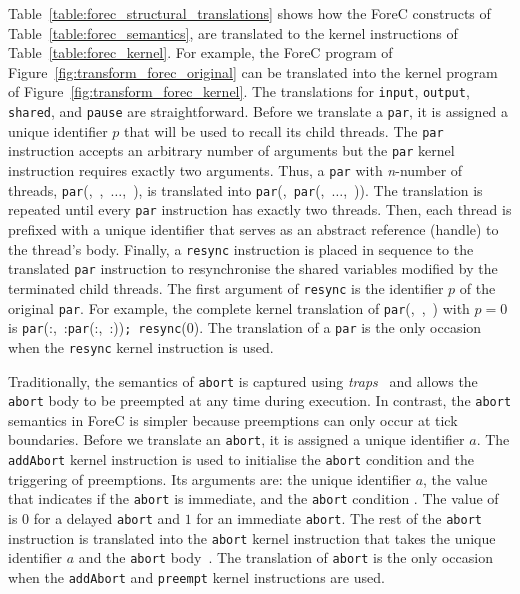 Table~\ref{table:forec_structural_translations} shows how 
the ForeC constructs of Table~\ref{table:forec_semantics}, 
are translated to the kernel instructions of Table~\ref{table:forec_kernel}.
For example, the ForeC program of Figure~\ref{fig:transform_forec_original} 
can be translated into the kernel program of Figure~\ref{fig:transform_forec_kernel}.
The translations for \verb$input$, \verb$output$, \verb$shared$, and 
\verb$pause$ are straightforward. Before we translate a \verb$par$,
it is assigned a unique identifier $p$ that will be used to recall 
its child threads. The \verb$par$ instruction accepts an arbitrary 
number of arguments but the \verb$par$ kernel instruction requires 
exactly two arguments. Thus, a \verb$par$ with \emph{n}-number of 
threads, \verb$par$(,~,~$\dots$,~), is 
translated into \verb$par$(,~\verb$par$(,~$\dots$,~)). 
The translation is repeated until every \verb$par$ instruction has 
exactly two threads. Then, each thread \body{} is prefixed with a 
unique identifier \thread{} that serves as an abstract reference 
(handle) to the thread's body. Finally, a \verb$resync$ instruction 
is placed in sequence to the translated \verb$par$ instruction to 
resynchronise the shared variables modified by the terminated child 
threads. The first argument of \verb$resync$ is the identifier $p$ 
of the original \verb$par$. For example, the complete kernel translation 
of \verb$par$(,~,~) with $p = 0$ is 
\verb$par$(:,~:\verb$par$(:,~:))\verb$;$~\verb$resync$($0$).
The translation of a \verb$par$ is the only occasion when the 
\verb$resync$ kernel instruction is used.

Traditionally, the semantics of \verb$abort$ is captured using 
\emph{traps}~\cite{EsterelV7} and allows the \verb$abort$ body 
to be preempted at any time during execution. In contrast, the 
\verb$abort$ semantics in ForeC is simpler because preemptions 
can only occur at tick boundaries. Before we translate an 
\verb$abort$, it is assigned a unique identifier $a$. The 
\verb$addAbort$ kernel instruction is used to initialise the 
\verb$abort$ condition and the triggering of preemptions. Its 
arguments are: the unique identifier $a$, the value \imm{} that
indicates if the \verb$abort$ is immediate, and the \verb$abort$
condition \expression{}. The value of \imm{} is $0$ for a delayed 
\verb$abort$ and $1$ for an immediate \verb$abort$. The rest of
the \verb$abort$ instruction is translated into the \verb$abort$
kernel instruction that takes the unique identifier $a$ and 
the \verb$abort$ body~\body{}. The translation of \verb$abort$ 
is the only occasion when the \verb$addAbort$ and \verb$preempt$ 
kernel instructions are used.


